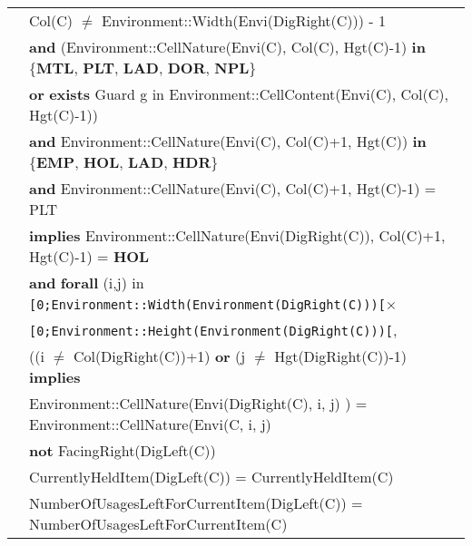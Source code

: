 \documentclass[7pt]{article}
\begin{document}
\begin{tabular}{rl}
& Col(C) $\neq$ Environment::Width(Envi(DigRight(C))) - 1 \\
& \quad \textbf{and} (Environment::CellNature(Envi(C), Col(C), Hgt(C)-1) \textbf{in} \{\textbf{MTL}, \textbf{PLT}, \textbf{LAD}, \textbf{DOR}, \textbf{NPL}\} \\
& \quad\quad \textbf{or} \textbf{exists} Guard g {in} Environment::CellContent(Envi(C), Col(C), Hgt(C)-1)) \\
& \quad \textbf{and} Environment::CellNature(Envi(C), Col(C)+1, Hgt(C)) \textbf{in} \{\textbf{EMP}, \textbf{HOL}, \textbf{LAD}, \textbf{HDR}\} \\
& \quad \textbf{and}  Environment::CellNature(Envi(C), Col(C)+1, Hgt(C)-1) = PLT \\
& \quad \textbf{implies} Environment::CellNature(Envi(DigRight(C)), Col(C)+1, Hgt(C)-1) = \textbf{HOL} \\
& \quad\quad \textbf{and} {\textbf{forall}} (i,j) {in} \texttt{[0;Environment::Width(Environment(DigRight(C)))[}× \\ & \quad\quad\quad\quad\quad\quad\quad\quad\quad\quad\texttt{[0;Environment::Height(Environment(DigRight(C)))[}, \\
       & \quad\quad\quad\quad\quad\quad ((i $\neq$ Col(DigRight(C))+1) \textbf{or}  (j $\neq$ Hgt(DigRight(C))-1) \textbf{implies} \\
       & \quad\quad\quad\quad\quad\quad\quad Environment::CellNature(Envi(DigRight(C), i, j) ) = Environment::CellNature(Envi(C, i, j) \\
& \textbf{not} FacingRight(DigLeft(C)) \\
& CurrentlyHeldItem(DigLeft(C)) = CurrentlyHeldItem(C) \\
& NumberOfUsagesLeftForCurrentItem(DigLeft(C)) = NumberOfUsagesLeftForCurrentItem(C) \\


\end{tabular}
\end{document}
